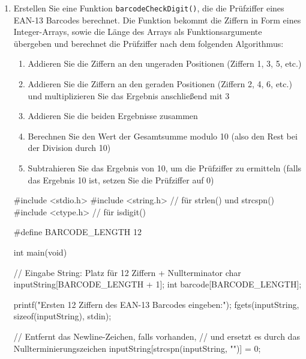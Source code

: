 \begin{enumerate}
\begin{codebox}[lang=c, fontsize=\small]
{    return 0;
}
\end{codebox}

\begin{mybox}[Bildschirmausgabe]{console}
Ersten 12 Ziffern des EAN-13 Barcodes eingeben:
4 5 9 8 7 6 3 4 2 1 7 8
\end{mybox}



\pagebreak

\item Erstellen Sie eine Funktion \texttt{barcodeCheckDigit()}, die die
Prüfziffer eines EAN-13 Barcodes berechnet. Die Funktion bekommt die Ziffern in
Form eines Integer-Arrays, sowie die Länge des Arrays als Funktionsargumente
übergeben und berechnet die Prüfziffer nach dem folgenden Algorithmus:

\begin{enumerate}[1.]
    \item Addieren Sie die Ziffern an den ungeraden Positionen (Ziffern 1, 3, 5,
    etc.)
    \item Addieren Sie die Ziffern an den geraden Positionen (Ziffern 2, 4, 6,
    etc.) und multiplizieren Sie das Ergebnis anschließend mit 3
    \item Addieren Sie die beiden Ergebnisse zusammen
    \item Berechnen Sie den Wert der Gesamtsumme modulo 10 (also den Rest bei
    der Division durch 10)
    \item Subtrahieren Sie das Ergebnis von 10, um die Prüfziffer zu ermitteln
    (falls das Ergebnis 10 ist, setzen Sie die Prüfziffer auf 0)
\end{enumerate}

\Vorlage
\begin{codebox}[lang=c, fontsize=\small]
#include <stdio.h>
#include <string.h> // für strlen() und strcspn()
#include <ctype.h>  // für isdigit()

#define BARCODE_LENGTH 12

int main(void) {
    // Eingabe String: Platz für 12 Ziffern + Nullterminator
    char inputString[BARCODE_LENGTH + 1];
    int barcode[BARCODE_LENGTH];

    printf("Ersten 12 Ziffern des EAN-13 Barcodes eingeben:\n");
    fgets(inputString, sizeof(inputString), stdin);

    // Entfernt das Newline-Zeichen, falls vorhanden,
    // und ersetzt es durch das Nullterminierungszeichen
    inputString[strcspn(inputString, "\n")] = 0;


}
\end{codebox}
\end{enumerate}
